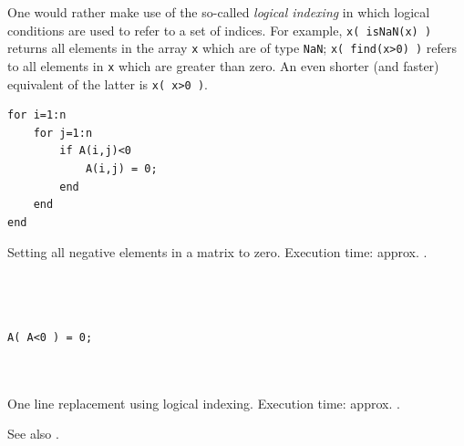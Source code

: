 One would rather make use of the so-called \emph{logical indexing} in which logical conditions are used to refer to a set of indices. For example, \lstinline!x( isNaN(x) )! returns all elements in the array \lstinline!x! which are of type \lstinline!NaN!; \lstinline!x( find(x>0) )! refers to all elements in \lstinline!x! which are greater than zero. An even shorter (and faster) equivalent of the latter is \lstinline!x( x>0 )!.

\hfill
\begin{minipage}[t]{.45\textwidth}
\begin{lstlisting}[framerule=2pt,rulecolor=\color{badred}]
for i=1:n
    for j=1:n
        if A(i,j)<0
            A(i,j) = 0;
        end
    end
end
\end{lstlisting}
Setting all negative elements in a matrix to zero.  Execution time: approx. .
\end{minipage}
\hfill
\begin{minipage}[t]{.45\textwidth}
\begin{lstlisting}[framerule=2pt,rulecolor=\color{goodgreen}]



A( A<0 ) = 0;



\end{lstlisting}
One line replacement using logical indexing.  Execution time: approx. .
\end{minipage}
\hfill

See also \cite{Mathworks:2001:MIM}.



% 
% 


